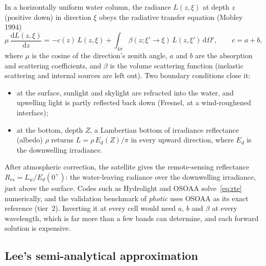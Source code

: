\documentclass[11pt]{article}
\numberwithin{equation}{section}
\begin{document}
In a horizontally uniform water column, the radiance $L(z, \xi)$ at depth $z$ (positive down) in
direction $\xi$ obeys the radiative transfer equation (Mobley 1994)
\begin{equation}
  \mu\, \frac{\mathrm{d}L(z,\xi)}{\mathrm{d}z} = -c(z)\, L(z,\xi)
  + \int_{4\pi} \beta(z; \xi' \to \xi)\, L(z,\xi')\, \mathrm{d}\Omega' ,
  \qquad c = a + b ,
  \label{eq:rte}
\end{equation}
where $\mu$ is the cosine of the direction's zenith angle, $a$ and $b$ are the absorption and
scattering coefficients, and $\beta$ is the volume scattering function (inelastic scattering
and internal sources are left out). Two boundary conditions close it:
\begin{itemize}
\item at the surface, sunlight and skylight are refracted into the water, and upwelling light is
  partly reflected back down (Fresnel, at a wind-roughened interface);
\item at the bottom, depth $Z$, a Lambertian bottom of irradiance reflectance (albedo) $\rho$
  returns $L = \rho\, E_d(Z)/\pi$ in every upward direction, where $E_d$ is the downwelling
  irradiance.
\end{itemize}
After atmospheric correction, the satellite gives the remote-sensing reflectance
$R_{rs} = L_w/E_d(0^+)$: the water-leaving radiance over the downwelling irradiance, just above
the surface. Codes such as Hydrolight and OSOAA solve~\eqref{eq:rte} numerically, and the
validation benchmark of \textit{photic} uses OSOAA as its exact reference (tier~2). Inverting it at every cell would
need $a$, $b$ and $\beta$ at every wavelength, which is far more than a few bands can determine,
and each forward solution is expensive.

\subsection{Lee's semi-analytical approximation}
\end{document}
